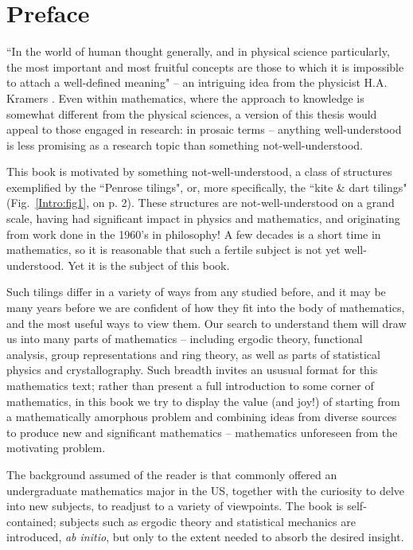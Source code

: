 \documentclass[reqno]{stml-l}
\theoremstyle{plain}
\theoremstyle{definition}
\numberwithin{equation}{chapter}
\begin{document}
\frontmatter


\tableofcontents

\chapter*{Preface}

``In the world of human thought generally, and in physical
science particularly, the most important and most fruitful
concepts are those to which it is impossible to attach a
well-defined meaning" -- an intriguing idea from the
physicist H.A. Kramers \cite{bib:Kra}. Even within mathematics,
where the approach to knowledge is somewhat different from
the physical sciences, a version of this thesis would
appeal to those engaged in research: in prosaic terms --
anything well-understood is less promising as a research
topic than something not-well-understood.

This book is motivated by something not-well-understood, a
class of structures exemplified by the ``Penrose tilings",
or, more specifically, the ``kite \& dart tilings"
(Fig.~\ref{Intro:fig1}, on p. 2). These structures are
not-well-understood on a grand scale, having had
significant impact in physics and mathematics, and
originating from work done in the 1960's in philosophy! A
few decades is a short time in mathematics, so it is
reasonable that such a fertile subject is not yet
well-understood. Yet it is the subject of this book.

Such tilings differ in a variety of ways from any studied
before, and it may be many years before we are confident of
how they fit into the body of mathematics, and the most
useful ways to view them. Our search to understand them
will draw us into many parts of mathematics -- including
ergodic theory, functional analysis, group representations
and ring theory, as well as parts of statistical physics
and crystallography. Such breadth invites an ususual format
for this mathematics text; rather than present a full
introduction to some corner of mathematics, in this book we
try to display the value (and joy!) of starting from a
mathematically amorphous problem and combining ideas from
diverse sources to produce new and significant mathematics
-- mathematics unforeseen from the motivating problem.

The background assumed of the reader is that commonly
offered an undergraduate mathematics major in the US,
together with the curiosity to delve into new subjects, to
readjust to a variety of viewpoints. The book is
self-contained; subjects such as ergodic theory and
statistical mechanics are introduced, \emph{ab initio}, but
only to the extent needed to absorb the desired insight.
\end{document}
